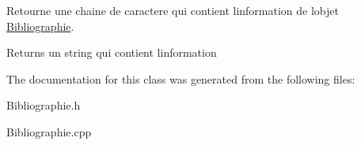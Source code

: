 Retourne une chaine de caractere qui contient l\textquotesingle{}information de l\textquotesingle{}objet \hyperlink{classtp_1_1Bibliographie}{Bibliographie}. 

\begin{DoxyReturn}{Returns}
un string qui contient l\textquotesingle{}information 
\end{DoxyReturn}


The documentation for this class was generated from the following files\+:\begin{DoxyCompactItemize}
\item 
Bibliographie.\+h\item 
Bibliographie.\+cpp\end{DoxyCompactItemize}
